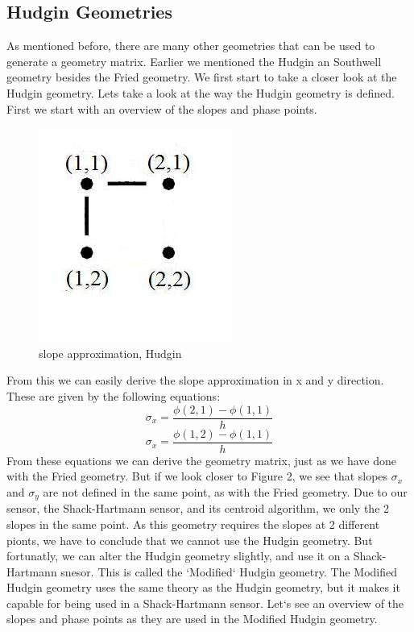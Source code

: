 \documentclass{article}
\begin{document}
\subsection{Hudgin Geometries}
As mentioned before, there are many other geometries that can be used to generate a geometry matrix. Earlier we mentioned the Hudgin an Southwell geometry besides the Fried geometry. We first start to take a closer look at the Hudgin geometry.
\newline
\newline
Lets take a look at the way the Hudgin geometry is defined. First we start with an overview of the slopes and phase points.
\begin{figure}[h!]
  \centering
  \includegraphics[scale=0.6]{figures/Hudgin}
  \caption{slope approximation, Hudgin}
\end{figure}
From this we can easily derive the slope approximation in x and y direction. These are given by the following equations:
$$ \sigma_x = \frac{\phi(2,1)-\phi(1,1)}{h}$$
$$ \sigma_x = \frac{\phi(1,2)-\phi(1,1)}{h}$$
From these equations we can derive the geometry matrix, just as we have done with the Fried geometry. But if we look closer to Figure 2, we see that slopes $\sigma_x$ and $\sigma_y$ are not defined in the same point, as with the Fried geometry. Due to our sensor, the Shack-Hartmann sensor, and its centroid algorithm, we only the 2 slopes in the same point. As this geometry requires the slopes at 2 different pionts, we have to conclude that we cannot use the Hudgin geometry. But fortunatly, we can alter the Hudgin geometry slightly, and use it on a Shack-Hartmann snesor. This is called the `Modified` Hudgin geometry\cite{rosensteiner2011cumulative}.
\newline
\newline
The Modified Hudgin geometry uses the same theory as the Hudgin geometry, but it makes it capable for being used in a Shack-Hartmann sensor. Let`s see an overview of the slopes and phase points as they are used in the Modified Hudgin geometry.  
\end{document}

